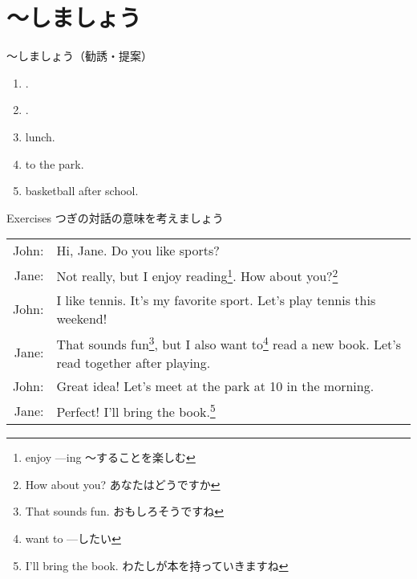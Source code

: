 \documentclass[aspectratio=169,xcolor={dvipsnames,table}]{beamer}
\begin{document}
\section{～しましょう}
\begin{frame}[plain]{～しましょう（勧誘・提案）}
 \begin{enumerate}
  \item<1->  .
  \item<2->  .
  \item<3->   lunch. 
  \item<4->   to the park.
  \item<5->   basketball after school.
 \end{enumerate}

\hfill{\scriptsize {}}
\end{frame}
\begin{frame}[plain]{Exercises}
つぎの対話の意味を考えましょう\hfill{\scriptsize {}}


\begin{tabular}{rp{}}
John:& Hi, Jane. Do you like sports?\\
Jane:& Not really, but I enjoy reading\footnote{enjoy ---ing ～することを楽しむ}. How about you?\footnote{How about you? あなたはどうですか}\\
John:& I like tennis. It's my favorite sport. Let's play tennis this weekend!\\
Jane:& That sounds fun\footnote{That sounds fun. おもしろそうですね}, but I also want to\footnote{want to ---したい} read a new book. Let's read together after playing.\\
John:& Great idea! Let's meet at the park at 10 in the morning.\\
Jane:& Perfect! I'll bring the book.\footnote{I'll bring the book. わたしが本を持っていきますね}
\end{tabular}
\end{frame}
\end{document}
